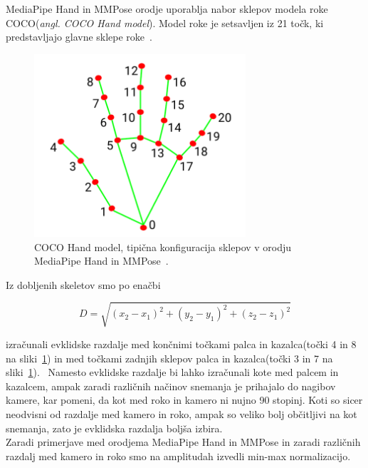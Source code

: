 \documentclass[a4paper,12pt]{article}  %
\begin{document}
MediaPipe Hand in MMPose orodje uporablja nabor sklepov modela roke COCO(\textit{angl. COCO Hand model}). Model roke 
je setsavljen iz 21 točk, ki predstavljajo glavne sklepe roke~\cite{Li1}. \\

\begin{figure}[H]
  \centering
  \includegraphics[width=0.7\textwidth]{slike/coco_hand.png}  
  \caption{COCO Hand model, tipična konfiguracija sklepov v orodju MediaPipe Hand in MMPose~\cite{Li1}.}
  \label{fig:coco_hand}
\end{figure}

Iz dobljenih skeletov smo po enačbi 

\begin{equation}
  D = \sqrt{(x_2-x_1)^2 + (y_2-y_1)^2 + (z_2-z_1)^2}
\end{equation}

izračunali evklidske razdalje med končnimi točkami palca in kazalca(točki 4 in 8 na sliki~\ref{fig:coco_hand}) in 
med točkami zadnjih sklepov palca in kazalca(točki 3 in 7 na sliki~\ref{fig:coco_hand}). \
Namesto evklidske razdalje bi lahko izračunali kote med palcem in kazalcem, ampak zaradi različnih 
načinov snemanja je prihajalo do nagibov kamere, kar pomeni, da kot med roko in kamero ni nujno 90 stopinj. 
Koti so sicer neodvisni od razdalje med kamero in roko, ampak so veliko bolj občitljivi na kot snemanja, 
zato je evklidska razdalja boljša izbira. \\

Zaradi primerjave med orodjema MediaPipe Hand in MMPose in zaradi različnih razdalj med kamero in roko smo na 
amplitudah izvedli min-max normalizacijo.
\end{document}
